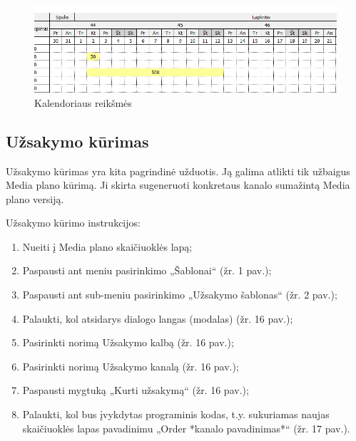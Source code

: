 \begin{figure}[H]
    \centering
    \includegraphics[scale=0.7]{Images/Screenshots/records-calendar.PNG}
    \caption{Kalendoriaus reikšmės}
    \label{img:model}
\end{figure}

\subsection{Užsakymo kūrimas}
Užsakymo kūrimas yra kita pagrindinė užduotis. Ją galima atlikti tik užbaigus Media plano kūrimą. Ji skirta sugeneruoti konkretaus kanalo sumažintą Media plano versiją.

\bigskip
Užsakymo kūrimo instrukcijos: 
\begin{enumerate}
    \itemsep0em 
    \item Nueiti į Media plano skaičiuoklės lapą;
    \item Paspausti ant meniu pasirinkimo „Šablonai“ (žr. 1 pav.);
    \item Paspausti ant sub-meniu pasirinkimo „Užsakymo šablonas“ (žr. 2 pav.);
    \item Palaukti, kol atsidarys dialogo langas (modalas) (žr. 16 pav.);
    \item Pasirinkti norimą Užsakymo kalbą (žr. 16 pav.);
    \item Pasirinkti norimą Užsakymo kanalą (žr. 16 pav.);
    \item Paspausti mygtuką „Kurti užsakymą“ (žr. 16 pav.);
    \item Palaukti, kol bus įvykdytas programinis kodas, t.y. sukuriamas naujas skaičiuoklės lapas pavadinimu „Order *kanalo pavadinimas*“ (žr. 17 pav.). 
\end{enumerate}

